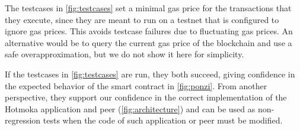 The testcases in \cref{fig:testcases} set a minimal gas price for the transactions that they execute,
since they are meant to run on a testnet that is configured to ignore gas prices. This avoids
testcase failures due to fluctuating gas prices. An alternative would be to query the current gas price of
the blockchain and use a safe overapproximation, but we do not show it here for simplicity.

If the testcases in \cref{fig:testcases} are run, they both succeed, giving confidence
in the expected behavior of the smart contract in \cref{fig:ponzi}. From another perspective,
they support our confidence in the correct implementation of the Hotmoka application
and peer  (\cref{fig:architecture}) and can be used as
non-regression tests when the code of such application or peer must be modified.
